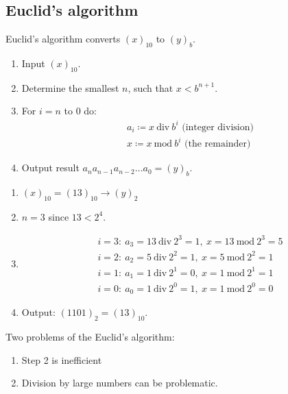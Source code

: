 \subsection{Euclid's algorithm}
Euclid's algorithm converts $(x)_{10}$ to $(y)_b$.
\begin{enumerate}%
    \item {
        Input $(x)_{10}$.
    }
    \item {
        Determine the smallest $n$, such that $x < b^{n+1}$.
    }
    \item {
        For $i=n$ to $0$ do:
        \begin{align*}
            &
            a_i \coloneqq x\ \mathrm{div}\ b^{i} \text{ (integer division)}
            \\&
            x \coloneqq x\ \mathrm{mod}\ b^{i} \text{ (the remainder)}
        \end{align*}
    }
    \item {
        Output result $a_n a_{n-1} a_{n-2} \dots a_0 = (y)_b$.
    }
\end{enumerate}

\begin{example}
    \begin{enumerate}
        \item {
            $(x)_{10} = (13)_{10} \to (y)_2$
        }
        \item {
            $n = 3$ since $13 < 2^4$.
        }
        \item {
            \begin{align*}
                &
                i = 3:\ a_3 = 13 \ \mathrm{div}\ 2^3 = 1,\
                x = 13 \ \mathrm{mod}\ 2^3 = 5
                \\&
                i = 2:\ a_2 = 5 \ \mathrm{div}\ 2^2 = 1,\
                x = 5 \ \mathrm{mod}\ 2^2 = 1
                \\&
                i = 1:\ a_1 = 1 \ \mathrm{div}\ 2^1 = 0,\
                x = 1 \ \mathrm{mod}\ 2^1 = 1
                \\&
                i = 0:\ a_0 = 1 \ \mathrm{div}\ 2^0 = 1,\
                x = 1 \ \mathrm{mod}\ 2^0 = 0
            \end{align*}
        }
        \item {
             Output: $(1101)_2 = (13)_{10}$.
        }
    \end{enumerate}
\end{example}
Two problems of the Euclid's algorithm:
\begin{enumerate}
    \item {
        Step 2 is inefficient
    }
    \item {
        Division by large numbers can be problematic.
    }
\end{enumerate}

